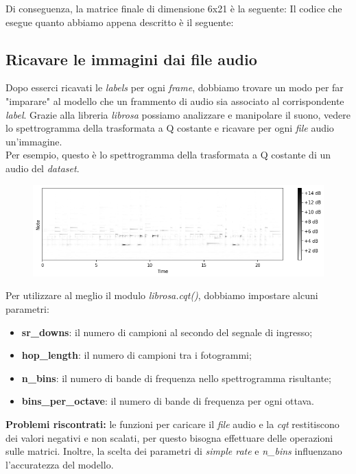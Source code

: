 \newline
Di conseguenza, la matrice finale di dimensione 6x21 è la seguente:
\vspace*{2ex}
\vspace*{2ex}
\noindent Il codice che esegue quanto abbiamo appena descritto è il seguente:
\vspace*{2ex}
\subsection{Ricavare le immagini dai file audio}
Dopo esserci ricavati le \textit{labels} per ogni \textit{frame}, dobbiamo trovare un modo per far "imparare" al modello che un frammento di audio sia associato al corrispondente \textit{label}.
Grazie alla libreria \textit{librosa} possiamo analizzare e manipolare il suono, vedere lo spettrogramma della trasformata a Q costante e ricavare per ogni \textit{file} audio un'immagine.\\
Per esempio, questo è lo spettrogramma della trasformata a Q costante di un audio del \textit{dataset}.
\begin{figure}[H]
	\centering
	\includegraphics[scale=0.60]{./images/img7.png}
\end{figure}
\noindent Per utilizzare al meglio il modulo \textit{librosa.cqt()}, dobbiamo impostare alcuni parametri:
\begin{itemize}
	\item \textbf{sr\_downs}: il numero di campioni al secondo del segnale di ingresso;
	\item \textbf{hop\_length}: il numero di campioni tra i fotogrammi;
	\item \textbf{n\_bins}: il numero di bande di frequenza nello spettrogramma risultante;
	\item \textbf{bins\_per\_octave}: il numero di bande di frequenza per ogni ottava.
\end{itemize}
\textbf{Problemi riscontrati:} le funzioni per caricare il \textit{file} audio e la \textit{cqt} restitiscono dei valori negativi e non scalati, per questo bisogna effettuare delle operazioni sulle matrici. Inoltre, la scelta dei parametri di \textit{simple rate} e \textit{n\_bins} influenzano l'accuratezza del modello. \\
